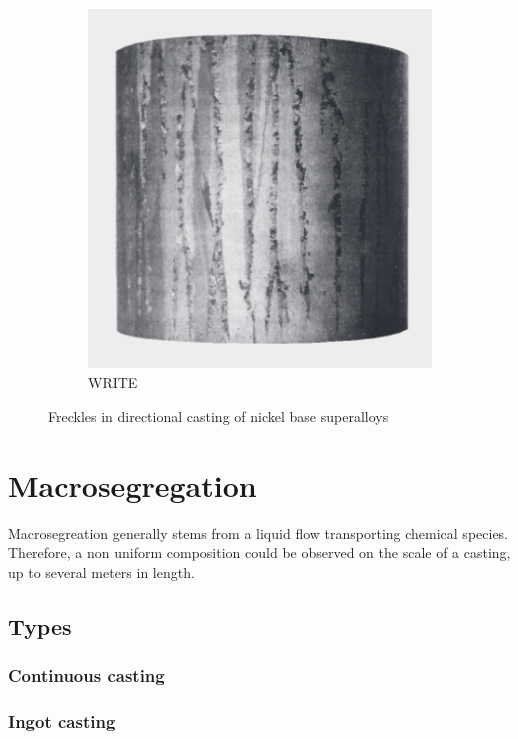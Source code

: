 \begin{figure}[b!]
\begin{subfigure}[t]{0.2\textwidth}
	\includegraphics[width=\textwidth]{Chapter0/Graphics/freckle2.png}
	\caption{WRITE}
    \label{fig:freckle2}
  \end{subfigure}
\caption{Freckles in directional casting of nickel base superalloys} 
\label{fig:freckle}
\end{figure}
\section{Macrosegregation}
Macrosegreation generally stems from a liquid flow transporting chemical species. Therefore, a non uniform composition could be observed on the scale 
of a casting, up to several meters in length. 
\subsection{Types}
\subsubsection*{Continuous casting}
\subsubsection*{Ingot casting}
